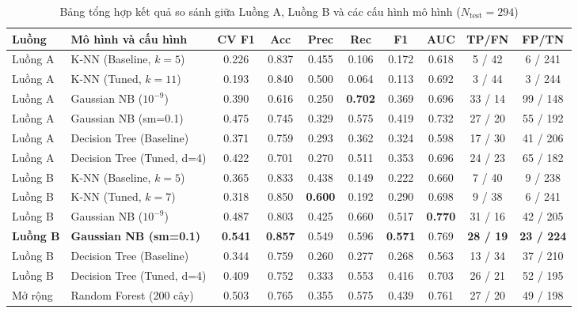 \begin{table}[H]
\caption{Bảng tổng hợp kết quả so sánh giữa Luồng A, Luồng B và các cấu hình mô hình ($N_{\text{test}} = 294$)}
\label{tab:ket-qua-thuc-nghiem}
\noindent
\setlength{\tabcolsep}{3.5pt}
\begin{tabularx}{\textwidth}{|L{1.8cm}|Y|c|c|c|c|c|c|c|c|}
\hline
\textbf{Luồng} & \textbf{Mô hình và cấu hình} & \textbf{CV F1} & \textbf{Acc} & \textbf{Prec} & \textbf{Rec} & \textbf{F1} & \textbf{AUC} & \textbf{TP/FN} & \textbf{FP/TN} \\
\hline
Luồng A & K-NN (Baseline, $k=5$)        & 0.226 & 0.837 & 0.455 & 0.106 & 0.172 & 0.618 & 5 / 42  & 6 / 241  \\
\hline
Luồng A & K-NN (Tuned, $k=11$)          & 0.193 & 0.840 & 0.500 & 0.064 & 0.113 & 0.692 & 3 / 44  & 3 / 244  \\
\hline
Luồng A & Gaussian NB ($10^{-9}$)       & 0.390 & 0.616 & 0.250 & \textbf{0.702} & 0.369 & 0.696 & 33 / 14 & 99 / 148 \\
\hline
Luồng A & Gaussian NB (sm=0.1)          & 0.475 & 0.745 & 0.329 & 0.575 & 0.419 & 0.732 & 27 / 20 & 55 / 192 \\
\hline
Luồng A & Decision Tree (Baseline)      & 0.371 & 0.759 & 0.293 & 0.362 & 0.324 & 0.598 & 17 / 30 & 41 / 206 \\
\hline
Luồng A & Decision Tree (Tuned, d=4)    & 0.422 & 0.701 & 0.270 & 0.511 & 0.353 & 0.696 & 24 / 23 & 65 / 182 \\
\hline
Luồng B & K-NN (Baseline, $k=5$)        & 0.365 & 0.833 & 0.438 & 0.149 & 0.222 & 0.660 & 7 / 40  & 9 / 238  \\
\hline
Luồng B & K-NN (Tuned, $k=7$)           & 0.318 & 0.850 & \textbf{0.600} & 0.192 & 0.290 & 0.698 & 9 / 38  & 6 / 241  \\
\hline
Luồng B & Gaussian NB ($10^{-9}$)       & 0.487 & 0.803 & 0.425 & 0.660 & 0.517 & \textbf{0.770} & 31 / 16 & 42 / 205 \\
\hline
\textbf{Luồng B} & \textbf{Gaussian NB (sm=0.1)} & \textbf{0.541} & \textbf{0.857} & 0.549 & 0.596 & \textbf{0.571} & 0.769 & \textbf{28 / 19} & \textbf{23 / 224} \\
\hline
Luồng B & Decision Tree (Baseline)      & 0.344 & 0.759 & 0.260 & 0.277 & 0.268 & 0.563 & 13 / 34 & 37 / 210 \\
\hline
Luồng B & Decision Tree (Tuned, d=4)    & 0.409 & 0.752 & 0.333 & 0.553 & 0.416 & 0.703 & 26 / 21 & 52 / 195 \\
\hline
Mở rộng & Random Forest (200 cây)       & 0.503 & 0.765 & 0.355 & 0.575 & 0.439 & 0.761 & 27 / 20 & 49 / 198 \\
\hline
\end{tabularx}
\end{table}

